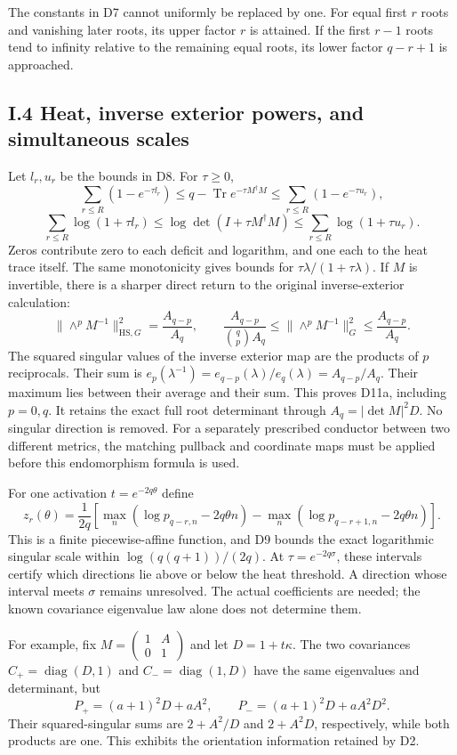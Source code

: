 \documentclass[11pt]{article}
\begin{document}
The constants in D7 cannot uniformly be replaced by one. For equal first \(r\) roots and vanishing later roots, its upper factor \(r\) is attained. If the first \(r-1\) roots tend to infinity relative to the remaining equal roots, its lower factor \(q-r+1\) is approached.

\subsection{I.4 Heat, inverse exterior powers, and simultaneous scales}\label{i.4-heat-inverse-exterior-powers-and-simultaneous-scales}

Let \(l_r,u_r\) be the bounds in D8. For \(\tau\ge0\), \[
 \sum_{r\le R}(1-e^{-\tau l_r})
 \le q-\operatorname{Tr}e^{-\tau M^\dagger M}
 \le\sum_{r\le R}(1-e^{-\tau u_r}),
 \tag{D10}
\] \[
 \sum_{r\le R}\log(1+\tau l_r)
 \le\log\det(I+\tau M^\dagger M)
 \le\sum_{r\le R}\log(1+\tau u_r).
 \tag{D11}
\] Zeros contribute zero to each deficit and logarithm, and one each to the heat trace itself. The same monotonicity gives bounds for \(\tau\lambda/(1+\tau\lambda)\). If \(M\) is invertible, there is a sharper direct return to the original inverse-exterior calculation: \[
 \boxed{\|\wedge^p M^{-1}\|_{\mathrm{HS},G}^{2}
       =\frac{A_{q-p}}{A_q},\qquad
 \frac{A_{q-p}}{\binom qp A_q}
 \le\|\wedge^pM^{-1}\|_G^2
 \le\frac{A_{q-p}}{A_q}.}
 \tag{D11a}
\] The squared singular values of the inverse exterior map are the products of \(p\) reciprocals. Their sum is \(e_p(\lambda^{-1})=e_{q-p}(\lambda)/e_q(\lambda)=A_{q-p}/A_q\). Their maximum lies between their average and their sum. This proves D11a, including \(p=0,q\). It retains the exact full root determinant through \(A_q=|\det M|^2D\). No singular direction is removed. For a separately prescribed conductor between two different metrics, the matching pullback and coordinate maps must be applied before this endomorphism formula is used.

For one activation \(t=e^{-2q\theta}\) define \[
 z_r(\theta)=\frac1{2q}
 \left[\max_n(\log p_{q-r,n}-2q\theta n)
       -\max_n(\log p_{q-r+1,n}-2q\theta n)\right].
\] This is a finite piecewise-affine function, and D9 bounds the exact logarithmic singular scale within \(\log(q(q+1))/(2q)\). At \(\tau=e^{-2q\sigma}\), these intervals certify which directions lie above or below the heat threshold. A direction whose interval meets \(\sigma\) remains unresolved. The actual coefficients are needed; the known covariance eigenvalue law alone does not determine them.

For example, fix \(M=\left(\begin{smallmatrix}1&A\\0&1\end{smallmatrix}\right)\) and let \(D=1+t\kappa\). The two covariances \(C_+=\operatorname{diag}(D,1)\) and \(C_-=\operatorname{diag}(1,D)\) have the same eigenvalues and determinant, but \[
 P_+=(a+1)^2D+aA^2,\qquad
 P_-=(a+1)^2D+aA^2D^2.
 \tag{D12}
\] Their squared-singular sums are \(2+A^2/D\) and \(2+A^2D\), respectively, while both products are one. This exhibits the orientation information retained by D2.
\end{document}
